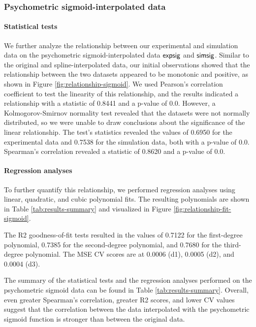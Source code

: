 \subsubsection{Psychometric sigmoid-interpolated data}

\paragraph{Statistical tests}

We further analyze the relationship between our experimental and simulation data on the psychometric sigmoid-interpolated data $\mathsf{expsig}$ and $\mathsf{simsig}$. Similar to the original and spline-interpolated data, our initial observations showed that the relationship between the two datasets appeared to be monotonic and positive, as shown in Figure \ref{fig:relationship-sigmoid}. We used Pearson's correlation coefficient to test the linearity of this relationship, and the results indicated a relationship with a statistic of 0.8441 and a p-value of 0.0. However, a Kolmogorov-Smirnov normality test revealed that the datasets were not normally distributed, so we were unable to draw conclusions about the significance of the linear relationship. The test's statistics revealed the values of 0.6950 for the experimental data and 0.7538 for the simulation data, both with a p-value of 0.0.
Spearman's correlation revealed a statistic of 0.8620 and a p-value of 0.0. 

\paragraph{Regression analyses}

To further quantify this relationship, we performed regression analyses using linear, quadratic, and cubic polynomial fits. The resulting polynomials are shown in Table \ref{tab:results-summary} and visualized in Figure \ref{fig:relationship-fit-sigmoid}. 

The R2 goodness-of-fit tests resulted in the values of 0.7122 for the first-degree polynomial, 0.7385 for the second-degree polynomial, and 0.7680 for the third-degree polynomial. The MSE CV scores are at 0.0006 (d1), 0.0005 (d2), and 0.0004 (d3). 

The summary of the statistical tests and the regression analyses performed on the psychometric sigmoid data can be found in Table \ref{tab:results-summary}. Overall, even greater Spearman's correlation, greater R2 scores, and lower CV values suggest that the correlation between the data interpolated with the psychometric sigmoid function is stronger than between the original data.